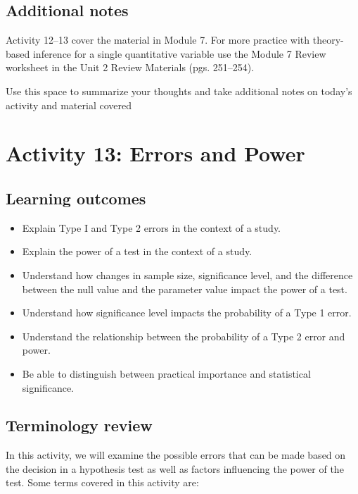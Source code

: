 \documentclass[
]{report}
\begin{document}
\subsection{Additional notes}\label{additional-notes-11}

Activity 12--13 cover the material in Module 7. For more practice with theory-based inference for a single quantitative variable use the Module 7 Review worksheet in the Unit 2 Review Materials (pgs. 251--254).

Use this space to summarize your thoughts and take additional notes on today's activity and material covered

\newpage

\section{Activity 13: Errors and Power}\label{activity-13-errors-and-power}


\subsection{Learning outcomes}\label{learning-outcomes-13}

\begin{itemize}
\item
  Explain Type I and Type 2 errors in the context of a study.
\item
  Explain the power of a test in the context of a study.
\item
  Understand how changes in sample size, significance level, and the difference between the null value and the parameter value impact the power of a test.
\item
  Understand how significance level impacts the probability of a Type 1 error.
\item
  Understand the relationship between the probability of a Type 2 error and power.
\item
  Be able to distinguish between practical importance and statistical significance.
\end{itemize}

\subsection{Terminology review}\label{terminology-review-11}

In this activity, we will examine the possible errors that can be made based on the decision in a hypothesis test as well as factors influencing the power of the test. Some terms covered in this activity are:
\end{document}
